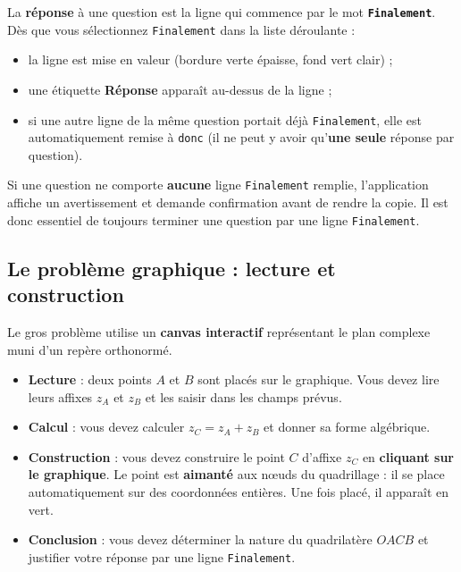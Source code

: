 \documentclass[11pt,a4paper]{article}
\begin{document}
\begin{retenir}
La \textbf{réponse} à une question est la ligne qui commence par le mot
\textbf{\texttt{Finalement}}. Dès que vous sélectionnez \texttt{Finalement}
dans la liste déroulante :
\begin{itemize}
  \item la ligne est mise en valeur (bordure verte épaisse, fond vert clair) ;
  \item une étiquette \textbf{Réponse} apparaît au-dessus de la ligne ;
  \item si une autre ligne de la même question portait déjà
        \texttt{Finalement}, elle est automatiquement remise à \texttt{donc}
        (il ne peut y avoir qu'\textbf{une seule} réponse par question).
\end{itemize}
\end{retenir}

\begin{attention}
Si une question ne comporte \textbf{aucune} ligne \texttt{Finalement}
remplie, l'application affiche un avertissement et demande confirmation avant
de rendre la copie. Il est donc essentiel de toujours terminer une question
par une ligne \texttt{Finalement}.
\end{attention}

\subsection{Le problème graphique : lecture et construction}

Le gros problème utilise un \textbf{canvas interactif} représentant le plan
complexe muni d'un repère orthonormé.

\begin{itemize}
  \item \textbf{Lecture} : deux points \(A\) et \(B\) sont placés sur le
        graphique. Vous devez lire leurs affixes \(z_A\) et \(z_B\) et les
        saisir dans les champs prévus.
  \item \textbf{Calcul} : vous devez calculer \(z_C = z_A + z_B\) et donner
        sa forme algébrique.
  \item \textbf{Construction} : vous devez construire le point \(C\)
        d'affixe \(z_C\) en \textbf{cliquant sur le graphique}. Le point est
        \textbf{aimanté} aux nœuds du quadrillage : il se place
        automatiquement sur des coordonnées entières. Une fois placé, il
        apparaît en vert.
  \item \textbf{Conclusion} : vous devez déterminer la nature du quadrilatère
        \(OACB\) et justifier votre réponse par une ligne \texttt{Finalement}.
\end{itemize}
\end{document}
